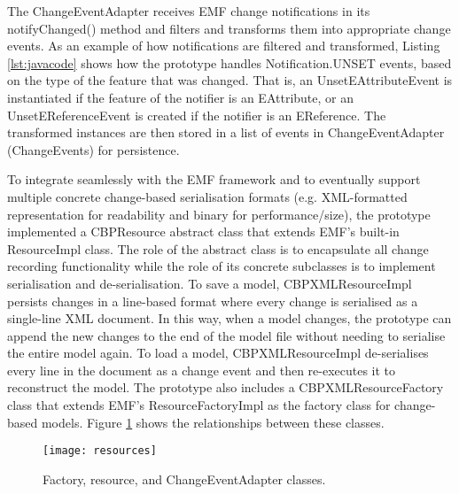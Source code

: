 The \textsf{ChangeEventAdapter} receives EMF change notifications in its \textsf{notifyChanged()} method and filters and transforms them into appropriate change events. As an example of how notifications are filtered and transformed, Listing \ref{lst:javacode} shows how the prototype handles \textsf{Notification.UNSET} events, based on the type of the feature that was changed. That is, an \textsf{UnsetEAttributeEvent} is instantiated if the feature of the notifier is an \textsf{EAttribute}, or an \textsf{UnsetEReferenceEvent} is created if the notifier is an \textsf{EReference}. The transformed instances are then stored in a list of events in \textsf{ChangeEventAdapter} (\textsf{ChangeEvents}) for persistence.

To integrate seamlessly with the EMF framework and to eventually support multiple concrete change-based serialisation formats (e.g. XML-formatted representation for readability and binary for performance/size), the prototype implemented a \textsf{CBPResource} abstract class that extends EMF’s built-in \textsf{ResourceImpl} class. The role of the abstract class is to encapsulate all change recording functionality while the role of its concrete subclasses is to implement serialisation and de-serialisation.
To save a model, \textsf{CBPXMLResourceImpl} persists changes in a line-based format where every change is serialised as a single-line XML document. In this way, when a model changes, the prototype can append the new changes to the end of the model file without needing to serialise the entire model again.
To load a model, \textsf{CBPXMLResourceImpl} de-serialises every line in the document as a change event and then re-executes it to reconstruct the model.
The prototype also includes a \textsf{CBPXMLResourceFactory} class that extends EMF’s \textsf{ResourceFactoryImpl} as the factory class for change-based models. Figure \ref{fig:resources} shows the relationships between these classes.

\begin{figure}[th]
  \centering
  \texttt{[image: resources]}
  \caption{Factory, resource, and ChangeEventAdapter classes.}
  \label{fig:resources}
\end{figure}

